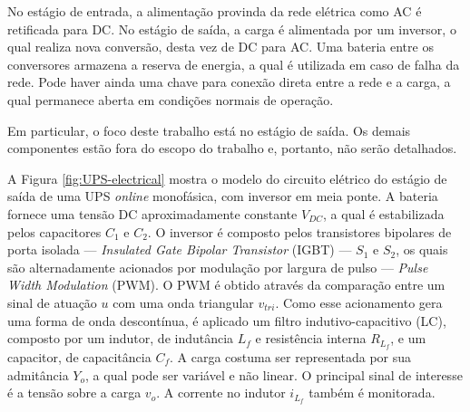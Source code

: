 \documentclass[repeatfields,oneside,overleaf]{tcc}
\begin{document}
No estágio de entrada, a alimentação provinda da rede elétrica como AC é retificada para DC.
No estágio de saída, a carga é alimentada por um inversor, o qual realiza nova conversão, desta vez de DC para AC.
Uma bateria entre os conversores armazena a reserva de energia, a qual é utilizada em caso de falha da rede.
Pode haver ainda uma chave para conexão direta entre a rede e a carga, a qual permanece aberta em condições normais de operação.

Em particular, o foco deste trabalho está no estágio de saída.
Os demais componentes estão fora do escopo do trabalho e, portanto, não serão detalhados.

A Figura \ref{fig:UPS-electrical} mostra o modelo do circuito elétrico do estágio de saída de uma UPS \textit{online} monofásica, com inversor em meia ponte.
A bateria fornece uma tensão DC aproximadamente constante $V_{DC}$, a qual é estabilizada pelos capacitores $C_1$ e $C_2$.
O inversor é composto pelos transistores bipolares de porta isolada --- \textit{Insulated Gate Bipolar Transistor} (IGBT) --- $S_1$ e $S_2$, os quais são alternadamente acionados por modulação por largura de pulso --- \textit{Pulse Width Modulation} (PWM).
O PWM é obtido através da comparação entre um sinal de atuação $u$ com uma onda triangular $v_{tri}$.
Como esse acionamento gera uma forma de onda descontínua, é aplicado um filtro indutivo-capacitivo (LC), composto por um indutor, de indutância $L_f$ e resistência interna $R_{L_f}$, e um capacitor, de capacitância $C_f$.
A carga costuma ser representada por sua admitância $Y_o$, a qual pode ser variável e não linear.
O principal sinal de interesse é a tensão sobre a carga $v_o$.
A corrente no indutor $i_{L_f}$ também é monitorada.
\end{document}
